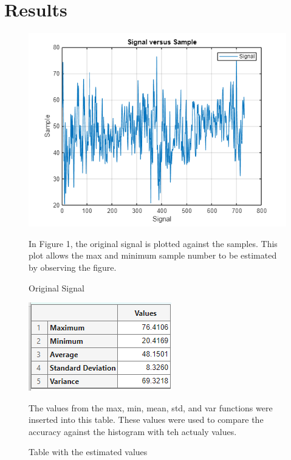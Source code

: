 \documentclass[journal]{IEEEtran}
\begin{document}
\section{Results}

\begin{figure}[h] %
    \centering
    \includegraphics[width=\linewidth]{1.3.png}
    \caption{Original Signal}
    \vspace{1em} %
    \begin{minipage}{\linewidth}
        \small
        In Figure 1, the original signal is plotted against the samples. This plot allows the max and minimum sample number to be estimated by observing the figure.
    \end{minipage}
    \label{Part 1.1: Signal vs Sample plot}
\end{figure}

\begin{figure}[ht] %
    \centering
    \includegraphics[width=\linewidth]{1.2.png}
    \caption{Table with the estimated values}
    \vspace{1em} %
    \begin{minipage}{\linewidth}
        \small The values from the max, min, mean, std, and var functions were inserted into this table. These values were used to compare the accuracy against the histogram with teh actualy values.
    \end{minipage}
    \label{Part 1: Estimated Value Table}
\end{figure}
\end{document}
